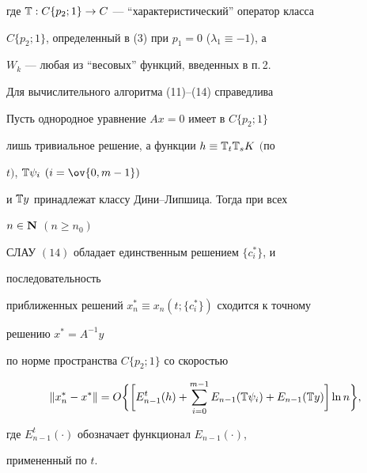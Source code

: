 где $\Bbb T:C\{p_2;1\}\to C$ --- ``характеристический'' оператор класса 


$C\{p_2;1\}$, определенный в (3) при $p_1=0$ ($\lambda_1\equiv-1$), а 


$W_k$ --- любая из ``весовых'' функций, введенных в п.\,2. 


 


Для вычислительного алгоритма (11)--(14) справедлива 


 


\begin{thm} 


Пусть однородное уравнение $A x=0$ имеет в $C\{p_2;1\}$ 


лишь тривиальное решение, а функции $h\equiv\Bbb T_t\Bbb T_s K$ $($по 


$t)$, $\Bbb T\psi_i$ $(i=\ov{0,m-1})$ 


и $\Bbb T y$ принадлежат классу Дини--Лип\-ши\-ца. Тогда при всех 


$n\in\bold N$ $(n\ge n_0)$ 


СЛАУ $(14)$ обладает единственным решением $\{c^*_i\}$, и 


последовательность 


приближенных решений $x^*_n\equiv x_n(t;\{c^*_i\})$ сходится к точному 


решению $x^*=A^{-1}y$ 


по норме пространства $C\{p_2;1\}$ со скоростью 


\begin{equation} 


\|x^*_n-x^*\|=O\bigg\{\bigg[E^t_{n-1}(h)+\sum^{m-1}_{i=0}E_{n-1} 


(\Bbb T\psi_i)+E_{n-1}(\Bbb T y)\bigg]\ln n\bigg\}, 


\end{equation} 


где $E^t_{n-1}(\cdot)$ обозначает функционал $E_{n-1}(\cdot)$, 


примененный по $t$. 


\end{thm} 


 


